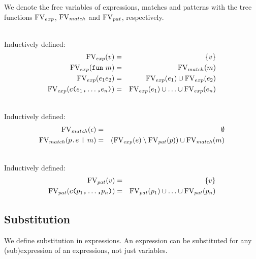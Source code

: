 We denote the free variables of expressions, matches and patterns with the tree
functions $\mathrm{FV}_{exp}$, $\mathrm{FV}_{match}$ and $\mathrm{FV}_{pat}$, respectively.

\begin{definition} \ \\
  Inductively defined:
  \begin{eqnarray}
    \mathrm{FV}_{exp} (v) &=& \{v\} \\
    \mathrm{FV}_{exp} (\texttt{fun}\  m) &=& \mathrm{FV}_{match} (m) \\
    \mathrm{FV}_{exp} (e_1e_2) &=& \mathrm{FV}_{exp} (e_1) \cup \mathrm{FV}_{exp} (e_2) \\
    \mathrm{FV}_{exp} (c\texttt{(}e_1\texttt{,} \ldots \texttt{,} e_n \texttt{)}) &=& \mathrm{FV}_{exp}
    (e_1) \cup \ldots \cup \mathrm{FV}_{exp} (e_n)
  \end{eqnarray}
\end{definition}

\begin{definition}\ \\ 
  Inductively defined:
  \begin{eqnarray}
    \mathrm{FV}_{match} (\epsilon) &=& \emptyset \\
    \mathrm{FV}_{match} (p\texttt{.}e\ \texttt{|}\ m) &=& \left( \mathrm{FV}_{exp}(e) \setminus
      \mathrm{FV}_{pat}(p) \right) \cup \mathrm{FV}_{match} (m)
  \end{eqnarray}
\end{definition}

\begin{definition} \ \\
  Inductively defined:
  \begin{eqnarray}
    \mathrm{FV}_{pat} (v) &=& \{v\} \\
    \mathrm{FV}_{pat} (c\texttt{(}p_1\texttt{,} \ldots \texttt{,} p_n\texttt{)}) &=& \mathrm{FV}_{pat} (p_1)
    \cup \ldots \cup \mathrm{FV}_{pat} (p_n)
  \end{eqnarray}
\end{definition}

\subsection{Substitution}
We define substitution in expressions. An expression can be substituted for any
(sub)expression of an expressions, not just variables.

